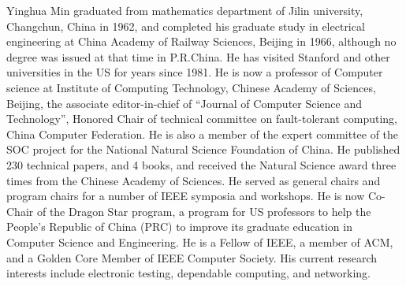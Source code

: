 \documentclass[10pt,journal,compsoc]{IEEEtran}
\begin{document}
\begin{IEEEbiography}{Yinghua Min} graduated from mathematics department of Jilin university, Changchun, China in 1962, and completed his graduate study in electrical engineering at China Academy of Railway Sciences, Beijing in 1966, although no degree was issued at that time in P.R.China.  He has visited Stanford and other universities in the US for years since 1981.  He is now a professor of Computer science at Institute of Computing Technology, Chinese Academy of Sciences, Beijing, the associate editor-in-chief of “Journal of Computer Science and Technology”, Honored Chair of technical committee on fault-tolerant computing, China Computer Federation.  He is also a member of the expert committee of the SOC project for the National Natural Science Foundation of China.  He published 230 technical papers, and 4 books, and received the Natural Science award three times from the Chinese Academy of Sciences.  He served as general chairs and program chairs for a number of IEEE symposia and workshops. He is now Co-Chair of the Dragon Star program, a program for US professors to help the People’s Republic of China (PRC) to improve its graduate education in Computer Science and Engineering. He is a Fellow of IEEE, a member of ACM, and a Golden Core Member of IEEE Computer Society.  His current research interests include electronic testing, dependable computing, and networking.
\end{IEEEbiography}
\end{document}
